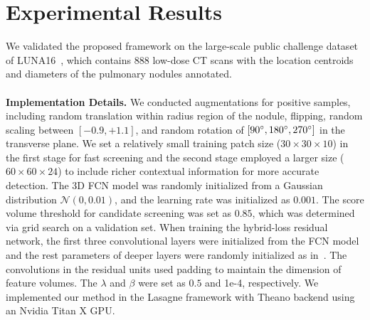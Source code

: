 \documentclass{llncs}
\begin{document}
\vspace{-3mm}
\section{Experimental Results}

We validated the proposed framework on the large-scale public challenge dataset of LUNA16~\cite{setio2016validation}, which contains $888$ low-dose CT scans with the location centroids and diameters of the pulmonary nodules annotated.
\\
\\
\textbf{Implementation Details.}
We conducted augmentations for positive samples, including random translation within radius region of the nodule, flipping, random scaling between $[-0.9,+1.1]$, and random rotation of $[90\degree, 180\degree, 270\degree]$ in the transverse plane.
We set a relatively small training patch size ($30\!\times\!30\!\times\!10$) in the first stage for fast screening 
and  the second stage employed a larger size ($60\!\times\!60\!\times\!24$) to include richer contextual information for more accurate detection.
The 3D FCN model was randomly initialized from a Gaussian distribution $\mathcal{N}(0,0.01)$, and the learning rate was initialized as $0.001$.
The score volume threshold for candidate screening was set as $0.85$, which was determined via grid search on a validation set.
When training the hybrid-loss residual network, the first three convolutional layers were initialized from the FCN model and the rest parameters of deeper layers were randomly initialized as in~\cite{he2016identity}.
The convolutions in the residual units used padding to maintain the dimension of feature volumes.
The $\lambda$ and $\beta$ were set as $0.5$ and 1e-4, respectively.
We implemented our method in the Lasagne framework with Theano backend using an Nvidia Titan X GPU.
\end{document}
